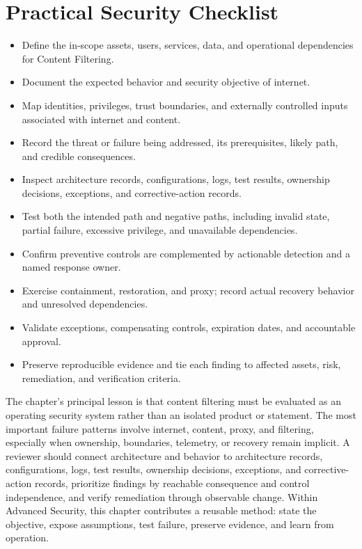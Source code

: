 \documentclass[11pt]{article}
\begin{document}
\section*{Practical Security Checklist}
\begin{itemize}[label=$\square$]
\item Define the in-scope assets, users, services, data, and operational dependencies for Content Filtering.
\item Document the expected behavior and security objective of internet.
\item Map identities, privileges, trust boundaries, and externally controlled inputs associated with internet and content.
\item Record the threat or failure being addressed, its prerequisites, likely path, and credible consequences.
\item Inspect architecture records, configurations, logs, test results, ownership decisions, exceptions, and corrective-action records.
\item Test both the intended path and negative paths, including invalid state, partial failure, excessive privilege, and unavailable dependencies.
\item Confirm preventive controls are complemented by actionable detection and a named response owner.
\item Exercise containment, restoration, and proxy; record actual recovery behavior and unresolved dependencies.
\item Validate exceptions, compensating controls, expiration dates, and accountable approval.
\item Preserve reproducible evidence and tie each finding to affected assets, risk, remediation, and verification criteria.
\end{itemize}
\begin{synthesisbox}
The chapter's principal lesson is that content filtering must be evaluated as an operating security system rather than an isolated product or statement. The most important failure patterns involve internet, content, proxy, and filtering, especially when ownership, boundaries, telemetry, or recovery remain implicit. A reviewer should connect architecture and behavior to architecture records, configurations, logs, test results, ownership decisions, exceptions, and corrective-action records, prioritize findings by reachable consequence and control independence, and verify remediation through observable change. Within Advanced Security, this chapter contributes a reusable method: state the objective, expose assumptions, test failure, preserve evidence, and learn from operation.
\end{synthesisbox}
\end{document}
